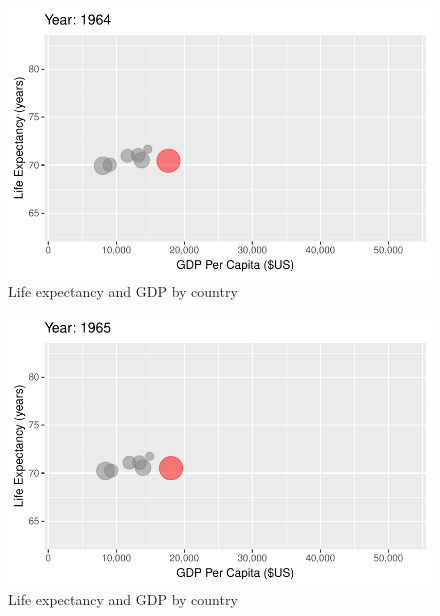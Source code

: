 \documentclass[
  letterpaper,
  DIV=11,
  numbers=noendperiod]{scrreport}
\theoremstyle{definition}
\theoremstyle{remark}
\begin{document}
\begin{figure}

{\centering \includegraphics{index_files/figure-pdf/fig-anim-country-23.pdf}

}

\caption{\label{fig-anim-country-23}Life expectancy and GDP by country}

\end{figure}

\begin{figure}

{\centering \includegraphics{index_files/figure-pdf/fig-anim-country-24.pdf}

}

\caption{\label{fig-anim-country-24}Life expectancy and GDP by country}

\end{figure}
\end{document}
